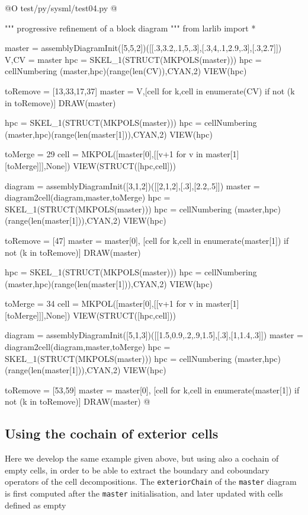 \documentclass[11pt,oneside]{article}	%
\begin{document}
@O test/py/sysml/test04.py
@{""" progressive refinement of a block diagram """
from larlib import *

master = assemblyDiagramInit([5,5,2])([[.3,3.2,.1,5,.3],[.3,4,.1,2.9,.3],[.3,2.7]])
V,CV = master
hpc = SKEL_1(STRUCT(MKPOLS(master)))
hpc = cellNumbering (master,hpc)(range(len(CV)),CYAN,2)
VIEW(hpc)

toRemove = [13,33,17,37]
master = V,[cell for k,cell in enumerate(CV) if not (k in toRemove)]
DRAW(master)

hpc = SKEL_1(STRUCT(MKPOLS(master)))
hpc = cellNumbering (master,hpc)(range(len(master[1])),CYAN,2)
VIEW(hpc)

toMerge = 29
cell = MKPOL([master[0],[[v+1 for v in  master[1][toMerge]]],None])
VIEW(STRUCT([hpc,cell]))

diagram = assemblyDiagramInit([3,1,2])([[2,1,2],[.3],[2.2,.5]])
master = diagram2cell(diagram,master,toMerge)
hpc = SKEL_1(STRUCT(MKPOLS(master)))
hpc = cellNumbering (master,hpc)(range(len(master[1])),CYAN,2)
VIEW(hpc)

toRemove = [47]
master = master[0], [cell for k,cell in enumerate(master[1]) if not (k in toRemove)]
DRAW(master)

hpc = SKEL_1(STRUCT(MKPOLS(master)))
hpc = cellNumbering (master,hpc)(range(len(master[1])),CYAN,2)
VIEW(hpc)

toMerge = 34
cell = MKPOL([master[0],[[v+1 for v in  master[1][toMerge]]],None])
VIEW(STRUCT([hpc,cell]))

diagram = assemblyDiagramInit([5,1,3])([[1.5,0.9,.2,.9,1.5],[.3],[1,1.4,.3]])
master = diagram2cell(diagram,master,toMerge)
hpc = SKEL_1(STRUCT(MKPOLS(master)))
hpc = cellNumbering (master,hpc)(range(len(master[1])),CYAN,2)
VIEW(hpc)

toRemove = [53,59]
master = master[0], [cell for k,cell in enumerate(master[1]) if not (k in toRemove)]
DRAW(master)
@}

\subsection{Using the cochain of exterior cells}
\label{sec:exterior}

Here we develop the same example \texttt{} given above, but using also a cochain of empty cells,
in order to be able to extract the boundary and coboundary operators of the cell decompositions. 
The \texttt{exteriorChain}
of the \texttt{master} diagram is first computed after the \texttt{master} initialisation, and later updated with cells defined as empty
\end{document}
